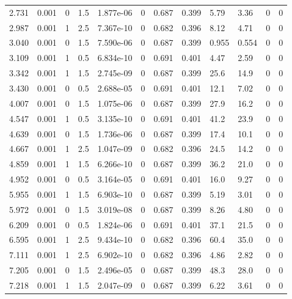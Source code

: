 \documentclass[preview]{standalone}
\begin{document}
{{\begin{tabular}{L{1.2cm}C{1.2cm} C{0.3cm}C{0.5cm} C{1.4cm}C{1.4cm} C{1.4cm}C{1.4cm} C{1.6cm}C{1.6cm} C{1.6cm}C{1.6cm}}
  2.731  &  0.001  & 0     & 1.5 &  1.877e-06  & 0  &  0.687&   0.399& 5.79 & 3.36   &  0 & 0  \\ 
  2.987  &  0.001  & 1     & 2.5 &  7.367e-10  & 0  &  0.682&   0.396& 8.12 & 4.71   &  0 & 0  \\ 
  3.040  &  0.001  & 0     & 1.5 &  7.590e-06  & 0  &  0.687&   0.399& 0.955 & 0.554   &  0 & 0  \\ 
  3.109  &  0.001  & 1     & 0.5 &  6.834e-10  & 0  &  0.691&   0.401& 4.47 & 2.59   &  0 & 0  \\ 
  3.342  &  0.001  & 1     & 1.5 &  2.745e-09  & 0  &  0.687&   0.399& 25.6 & 14.9   &  0 & 0  \\ 
  3.430  &  0.001  & 0     & 0.5 &  2.688e-05  & 0  &  0.691&   0.401& 12.1 & 7.02   &  0 & 0  \\ 
  4.007  &  0.001  & 0     & 1.5 &  1.075e-06  & 0  &  0.687&   0.399& 27.9 & 16.2   &  0 & 0  \\ 
  4.547  &  0.001  & 1     & 0.5 &  3.135e-10  & 0  &  0.691&   0.401& 41.2 & 23.9   &  0 & 0  \\ 
  4.639  &  0.001  & 0     & 1.5 &  1.736e-06  & 0  &  0.687&   0.399& 17.4 & 10.1   &  0 & 0  \\ 
  4.667  &  0.001  & 1     & 2.5 &  1.047e-09  & 0  &  0.682&   0.396& 24.5 & 14.2   &  0 & 0  \\ 
  4.859  &  0.001  & 1     & 1.5 &  6.266e-10  & 0  &  0.687&   0.399& 36.2 & 21.0   &  0 & 0  \\ 
  4.952  &  0.001  & 0     & 0.5 &  3.164e-05  & 0  &  0.691&   0.401& 16.0 & 9.27   &  0 & 0  \\ 
  5.955  &  0.001  & 1     & 1.5 &  6.903e-10  & 0  &  0.687&   0.399& 5.19 & 3.01   &  0 & 0  \\ 
  5.972  &  0.001  & 0     & 1.5 &  3.019e-08  & 0  &  0.687&   0.399& 8.26 & 4.80   &  0 & 0  \\ 
  6.209  &  0.001  & 0     & 0.5 &  1.824e-06  & 0  &  0.691&   0.401& 37.1 & 21.5   &  0 & 0  \\ 
  6.595  &  0.001  & 1     & 2.5 &  9.434e-10  & 0  &  0.682&   0.396& 60.4 & 35.0   &  0 & 0  \\ 
  7.111  &  0.001  & 1     & 2.5 &  6.902e-10  & 0  &  0.682&   0.396& 4.86 & 2.82   &  0 & 0  \\ 
  7.205  &  0.001  & 0     & 1.5 &  2.496e-05  & 0  &  0.687&   0.399& 48.3 & 28.0   &  0 & 0  \\ 
  7.218  &  0.001  & 1     & 1.5 &  2.047e-09  & 0  &  0.687&   0.399& 6.22 & 3.61   &  0 & 0  \\ 

\end{tabular}}}
\end{document}
